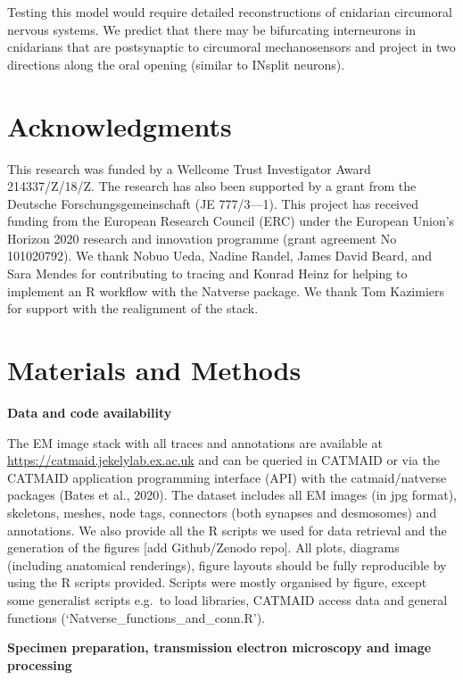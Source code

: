 \documentclass[
  11pt,
]{article}
\begin{document}
Testing this model would require detailed reconstructions of cnidarian
circumoral nervous systems. We predict that there may be bifurcating
interneurons in cnidarians that are postsynaptic to circumoral
mechanosensors and project in two directions along the oral opening
(similar to INsplit neurons).

\section{Acknowledgments}\label{acknowledgments}

This research was funded by a Wellcome Trust Investigator Award
214337/Z/18/Z. The research has also been supported by a grant from the
Deutsche Forschungsgemeinschaft (JE 777/3---1). This project has
received funding from the European Research Council (ERC) under the
European Union's Horizon 2020 research and innovation programme (grant
agreement No 101020792). We thank Nobuo Ueda, Nadine Randel, James David
Beard, and Sara Mendes for contributing to tracing and Konrad Heinz for
helping to implement an R workflow with the Natverse package. We thank
Tom Kazimiers for support with the realignment of the stack.

\section{Materials and Methods}\label{materials-and-methods}

\textbf{Data and code availability}

The EM image stack with all traces and annotations are available at
\url{https://catmaid.jekelylab.ex.ac.uk} and can be queried in CATMAID
or via the CATMAID application programming interface (API) with the
catmaid/natverse packages (Bates et al., 2020). The dataset includes all
EM images (in jpg format), skeletons, meshes, node tags, connectors
(both synapses and desmosomes) and annotations. We also provide all the
R scripts we used for data retrieval and the generation of the figures
{[}add Github/Zenodo repo{]}. All plots, diagrams (including anatomical
renderings), figure layouts should be fully reproducible by using the R
scripts provided. Scripts were mostly organised by figure, except some
generalist scripts e.g.~to load libraries, CATMAID access data and
general functions (`Natverse\_functions\_and\_conn.R').

\textbf{Specimen preparation, transmission electron microscopy and image
processing}
\end{document}
